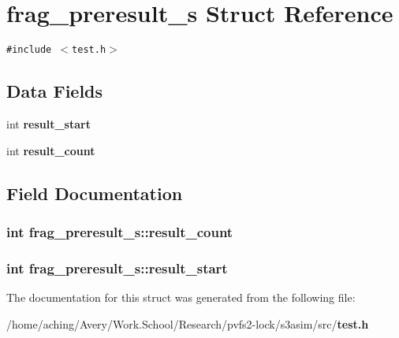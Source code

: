 \section{frag\_\-preresult\_\-s Struct Reference}
\label{structfrag__preresult__s}
{\tt \#include $<$test.h$>$}

\subsection*{Data Fields}
\begin{CompactItemize}
\item 
int \bf{result\_\-start}
\item 
int \bf{result\_\-count}
\end{CompactItemize}


\subsection{Field Documentation}
\subsubsection{\setlength{\rightskip}{0pt plus 5cm}int \bf{frag\_\-preresult\_\-s::result\_\-count}}\label{structfrag__preresult__s_416cc5c0a7343debe883ca9552cd0c60}


\subsubsection{\setlength{\rightskip}{0pt plus 5cm}int \bf{frag\_\-preresult\_\-s::result\_\-start}}\label{structfrag__preresult__s_55ad7dd8c269c8b2866285820e1efac2}




The documentation for this struct was generated from the following file:\begin{CompactItemize}
\item 
/home/aching/Avery/Work.School/Research/pvfs2-lock/s3asim/src/\bf{test.h}\end{CompactItemize}
